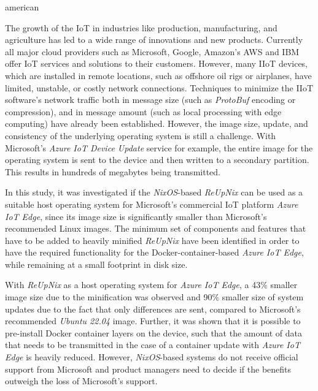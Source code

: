 \begin{otherlanguage*}{american}

The growth of the \ac{IoT} in industries like production, manufacturing, and
agriculture has led to a wide range of innovations and new products. Currently
all major cloud providers such as Microsoft, Google, Amazon's AWS and IBM offer
\ac{IoT} services and solutions to their customers. However, many \ac{IIoT} devices,
which are installed in remote locations, such as offshore oil rigs or airplanes,
have limited, unstable, or costly network connections. Techniques to
minimize the \ac{IIoT} software's network traffic both in message size
(such as \textit{ProtoBuf} encoding or compression), and in message amount
(such as local processing with edge computing) have already been established.
However, the image size, update, and consistency of the underlying operating
system is still a challenge. With Microsoft's \textit{Azure IoT Device
Update} service for example, the entire image for the operating system is sent
to the device and then written to a secondary partition. This results in hundreds
of megabytes being transmitted.

In this study, it was investigated if the \textit{NixOS}-based \textit{ReUpNix}
can be used as a suitable host operating system for Microsoft's commercial
\ac{IoT} platform \textit{Azure IoT Edge}, since its image size is significantly
smaller than Microsoft's recommended Linux images.
The  minimum set of components and features that have to be added to heavily
minified \textit{ReUpNix} have been identified in order to have the required
functionality for the
Docker-container-based \textit{Azure IoT Edge}, while remaining at a small
footprint in disk size.

With \textit{ReUpNix} as a host operating system for \textit{Azure IoT Edge}, a
43\% smaller image size due to the minification was observed and 90\% smaller size of
system updates due to the fact that only differences are sent, compared to
Microsoft's recommended \textit{Ubuntu 22.04} image.
Further, it was shown that it is possible to pre-install Docker container
layers on the device, such that the amount of data that needs to be transmitted
in the case of a container update with \textit{Azure IoT Edge} is heavily reduced.
However, \textit{NixOS}-based systems do not receive official support from
Microsoft and product managers need to decide if the benefits outweigh the loss
of Microsoft's support.

\end{otherlanguage*}


